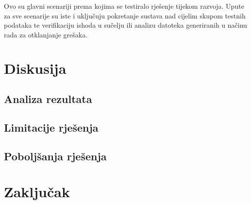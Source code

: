 \documentclass{foi}
\begin{document}
Ovo su glavni scenariji prema kojima se testiralo rješenje tijekom razvoja. Upute za sve scenarije su iste i uključuju pokretanje sustava nad cijelim skupom testnih podataka te verifikaciju ishoda u sučelju ili analizu datoteka generiranih u načinu rada za otklanjanje grešaka.

\chapter{Diskusija}
\section{Analiza rezultata}
\section{Limitacije rješenja}
\section{Poboljšanja rješenja}

\chapter{Zaključak}

\printbibliography[title=Popis literature]

\listoffigures
{}
 
\listoftables
{}

\appendix
\renewcommand{\thechapter}{\arabic{chapter}}
\end{document}

